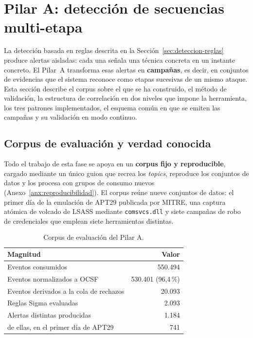 \section{Pilar A: detección de secuencias multi-etapa}
\label{sec:pilarA}

La detección basada en reglas descrita en la Sección~\ref{sec:deteccion-reglas} produce
alertas aisladas: cada una señala una técnica concreta en un instante concreto. El Pilar~A
transforma esas alertas en \textbf{campañas}, es decir, en conjuntos de evidencias que el
sistema reconoce como etapas sucesivas de un mismo ataque. Esta sección describe el corpus
sobre el que se ha construido, el método de validación, la estructura de correlación en dos
niveles que impone la herramienta, los tres patrones implementados, el esquema común en que
se emiten las campañas y su validación en modo continuo.

\subsection{Corpus de evaluación y verdad conocida}

Todo el trabajo de esta fase se apoya en un \textbf{corpus fijo y reproducible}, cargado
mediante un único guion que recrea los \textit{topics}, reproduce los conjuntos de datos y
los procesa con grupos de consumo nuevos (Anexo~\ref{anx:reproducibilidad}). El corpus reúne
nueve conjuntos de datos: el primer día de la emulación de APT29 publicada por MITRE, una
captura atómica de volcado de LSASS mediante \texttt{comsvcs.dll} y siete campañas de robo
de credenciales que emplean siete herramientas distintas.

\begin{table}[H]
\centering
\begin{tabular}{|l|r|}
\hline
\textbf{Magnitud} & \textbf{Valor} \\
\hline
Eventos consumidos & 550.494 \\
Eventos normalizados a OCSF & 530.401 (96,4\,\%) \\
Eventos derivados a la cola de rechazos & 20.093 \\
Reglas Sigma evaluadas & 2.093 \\
Alertas distintas producidas & 1.184 \\
\quad de ellas, en el primer día de APT29 & 741 \\
\hline
\end{tabular}
\caption{Corpus de evaluación del Pilar A.}
\label{tab:corpus-f3}
\end{table}


